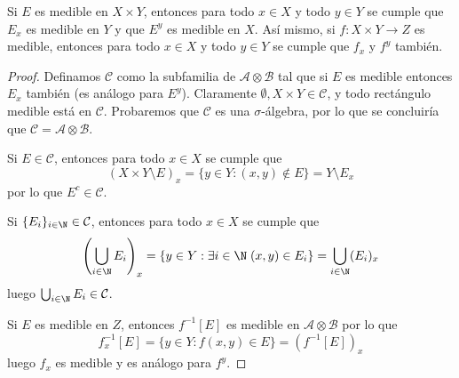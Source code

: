 \begin{prop}
	Si $E$ es medible en $X\times Y$, entonces para todo $x\in X$ y todo $y\in Y$ se cumple que $E_x$ es medible en $Y$ y que $E^y$ es medible en $X$.
	Así mismo, si $f\colon X\times Y\to Z$ es medible, entonces para todo $x\in X$ y todo $y\in Y$ se cumple que $f_x$ y $f^y$ también.
\end{prop}
\begin{proof}
	Definamos $\mathcal{C}$ como la subfamilia de $\mathcal{A\otimes B}$ tal que si $E$ es medible entonces $E_x$ también (es análogo para $E^y$).
	Claramente $\emptyset, X\times Y \in \mathcal{C}$, y todo rectángulo medible está en $\mathcal{C}$.
	Probaremos que $\mathcal{C}$ es una $\sigma$-álgebra, por lo que se concluiría que $\mathcal{C = A\otimes B}$.

	Si $E\in \mathcal{C}$, entonces para todo $x\in X$ se cumple que
	$$ (X\times Y\setminus E)_x = \{y\in Y:(x,y)\notin E\} = Y\setminus E_x $$
	por lo que $E^c \in \mathcal{C}$.

	Si $\{E_i\}_{i\in\N}\in\mathcal{C}$, entonces para todo $x\in X$ se cumple que
	$$ \left( \bigcup_{i\in\N} E_i \right)_x = \{y\in Y: \exists i\in\N\;(x,y)\in E_i\} = \bigcup_{i\in\N}(E_i)_x $$
	luego $\bigcup_{i\in\N} E_i \in \mathcal{C}$.
	\par
	Si $E$ es medible en $Z$, entonces $f^{-1}[E]$ es medible en $\mathcal{A\otimes B}$ por lo que
	$$ f_x^{-1}[E] = \{y\in Y:f(x,y)\in E\} = (f^{-1}[E])_x $$
	luego $f_x$ es medible y es análogo para $f^y$.
\end{proof}

